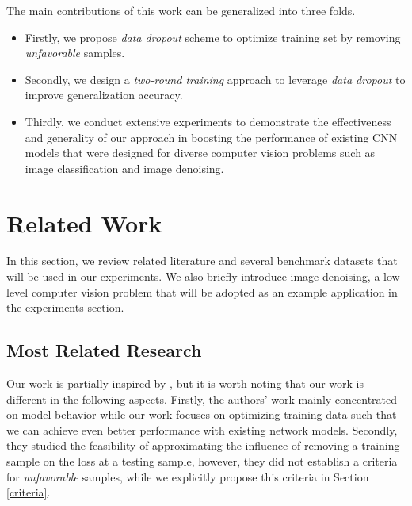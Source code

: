 \documentclass[10pt, conference, letterpaper]{IEEEtran}
\begin{document}

The main contributions of this work can be generalized into three folds.
\begin{itemize}
\item Firstly, we propose \emph{data dropout} scheme to optimize training set by removing \emph{unfavorable} samples.
\item Secondly, we design a \emph{two-round training} approach to leverage \emph{data dropout} to improve generalization accuracy.
\item Thirdly, we conduct extensive experiments to demonstrate the effectiveness and generality of our approach in boosting the performance of existing CNN models that were designed for diverse computer vision problems such as image classification and image denoising.
\end{itemize}


\section{Related Work}
\label{relatedwork}

In this section, we review related literature and several benchmark datasets that will be used in our experiments. We also briefly introduce image denoising, a low-level computer vision problem that will be adopted as an example application in the experiments section.

\subsection{Most Related Research}

Our work is partially inspired by \cite{koh2017understanding}, but it is worth noting that our work is different in the following aspects. Firstly, the authors' work mainly concentrated on model behavior while our work focuses on optimizing training data such that we can achieve even better performance with existing network models. Secondly, they studied the feasibility of approximating the influence of removing a training sample on the loss at a testing sample, however, they did not establish a criteria for \emph{unfavorable} samples, while we explicitly propose this criteria in Section \ref{criteria}. 
\end{document}
